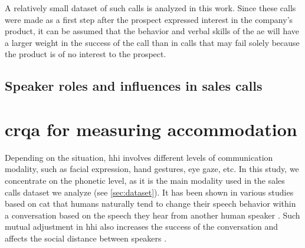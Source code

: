 A relatively small dataset of such calls is analyzed in this work.
Since these calls were made as a first step after the prospect expressed interest in the company's product, it can be assumed that the behavior and verbal skills of the \ac{ae} will have a  larger weight in the success of the call than in calls that may fail solely because the product is of no interest to the prospect.


\subsection{Speaker roles and influences in sales calls}
\label{subsec:speaker_roles_and_influences_in_sales_calls}


\citet{Glaser2016conversational}
\citet{SilberVarod2018human}

\section[\Acl{crqa}]{\Acl{crqa} for measuring accommodation}
\label{sec:crqa}



Depending on the situation, \ac{hhi} involves different levels of communication modality, such as facial expression, hand gestures, eye gaze, etc.
In this study, we concentrate on the phonetic level, as it is the main modality used in the sales calls dataset we analyze (see \cref{sec:dataset}).
It has been shown in various studies based on \ac{cat} \citep{Giles1991CAT,Gallois2015CAT} that humans naturally tend to change their speech behavior within a conversation based on the speech they hear from another human speaker \citep{Bailly2010speech,Babel2014novelty}.
Such mutual adjustment in \ac{hhi} also increases the success of the conversation \citep{Pickering2004behavioral} and affects the social distance between speakers \citep{Schweitzer2017social}.

